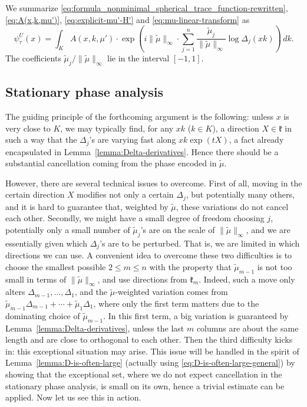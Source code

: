 \documentclass[11pt,oneside]{amsart}
\numberwithin{equation}{section}
\theoremstyle{remark}
\theoremstyle{plain}
\newcommand\mfk{\mathfrak{k}}
\renewcommand\leq{\leqslant}
\begin{document}
We summarize \eqref{eq:formula_nonminimal_spherical_trace_function-rewritten}, \eqref{eq:A(x,k,mu')}, \eqref{eq:explicit-mu'-H'} and \eqref{eq:mu-linear-transform} as
\begin{equation}\label{eq:stationary-phase-prep-upshot}
\psi_\tau^{U}(x)=\int_K A(x,k,\mu') \cdot \exp\left(i\|\tilde{\mu}\|_{\infty}\cdot \sum_{j=1}^n \frac{\tilde{\mu}_j}{\|\tilde{\mu}\|_{\infty}} \log \Delta_j(xk)\right) \,dk.
\end{equation}
The coefficients $\tilde{\mu}_j/\|\tilde{\mu}\|_{\infty}$ lie in the interval $[-1,1]$.

\subsection{Stationary phase analysis}\label{sec45}
The guiding principle of the forthcoming argument is the following: unless $x$ is very close to $K$, we may typically find, for any $xk$ ($k\in K$), a direction $X\in\mfk$ in such a way that the $\Delta_j$'s are varying fast along $xk\exp(tX)$, a fact already encapsulated in Lemma~\ref{lemma:Delta-derivatives}. Hence there should be a substantial cancellation coming from the phase encoded in $\tilde{\mu}$.

However, there are several technical issues to overcome. First of all, moving in the certain direction $X$ modifies not only a certain $\Delta_j$, but potentially many others, and it is hard to guarantee that, weighted by $\tilde{\mu}$, these variations do not cancel each other. Secondly, we might have a small degree of freedom choosing $j$, potentially only a small number of $\tilde{\mu}_j$'s are on the scale of $\|\tilde{\mu}\|_{\infty}$, and we are essentially given which $\Delta_j$'s are to be perturbed. That is, we are limited in which directions we can use. A convenient idea to overcome these two difficulties is to choose the smallest possible $2\leq m\leq n$ with the property that $\tilde{\mu}_{m-1}$ is not too small in terms of $\|\tilde{\mu}\|_{\infty}$, and use directions from $\mfk_{m}$. Indeed, such a move only alters $\Delta_{m-1},\dotsc,\Delta_1$, and the $\tilde{\mu}$-weighted variation comes from $\tilde{\mu}_{m-1}\Delta_{m-1}+\dotsb+\tilde{\mu}_1\Delta_1$, where only the first term matters due to the dominating choice of $\tilde{\mu}_{m-1}$. In this first term, a big variation is guaranteed by Lemma~\ref{lemma:Delta-derivatives}, unless the last $m$ columns are about the same length and are close to orthogonal to each other. Then the third difficulty kicks in: this exceptional situation may arise. This issue will be handled in the spirit of Lemma~\ref{lemma:D-is-often-large} (actually using \eqref{eq:D-is-often-large-general}) by showing that the exceptional set, where we do not expect cancellation in the stationary phase analysis, is small on its own, hence a trivial estimate can be applied. Now let us see this in action.
\end{document}
